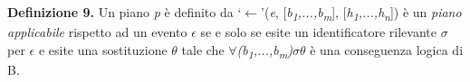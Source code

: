 \smallskip
\textbf{Definizione 9.} Un piano \textit{p} \`e definito da `$\leftarrow$'(\textit{e}, [\textit{b\textsubscript{1},...,b\textsubscript{m}}], [\textit{h\textsubscript{1},...,h\textsubscript{n}}]) \`e un \textit{piano applicabile} rispetto ad un evento \textit{$\epsilon$} se e solo se esite un identificatore rilevante $\sigma$ per \textit{$\epsilon$} e esite una sostituzione \textit{$\theta$} tale che $\forall$\textit{(b\textsubscript{1},...,b\textsubscript{m})}\textit{$\sigma\theta$} \`e una conseguenza logica di B.

%
%
%
%
%
